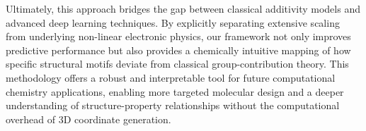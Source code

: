 \documentclass[]{article}
\begin{document}
Ultimately, this approach bridges the gap between classical additivity models and advanced deep learning techniques. By explicitly separating extensive scaling from underlying non-linear electronic physics, our framework not only improves predictive performance but also provides a chemically intuitive mapping of how specific structural motifs deviate from classical group-contribution theory. This methodology offers a robust and interpretable tool for future computational chemistry applications, enabling more targeted molecular design and a deeper understanding of structure-property relationships without the computational overhead of 3D coordinate generation.


{}

\end{document}
